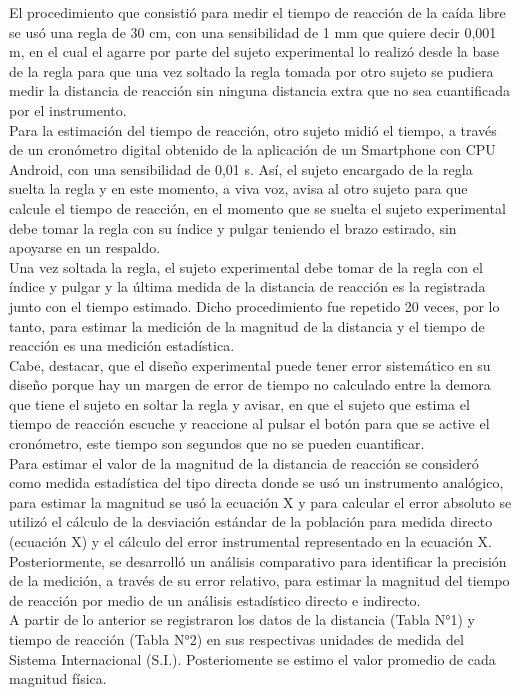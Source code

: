 \documentclass[runningheads]{llncs}
\begin{document}
    El procedimiento que consistió para medir el tiempo de reacción de la caída libre se usó una regla de 30 cm, con una sensibilidad de 1 mm que quiere decir 0,001 m, en el cual el agarre por parte del sujeto experimental lo realizó desde la base de la regla para que una vez soltado la regla tomada por otro sujeto se pudiera medir la distancia de reacción sin ninguna distancia extra que no sea cuantificada por el instrumento. \\
    \linebreak
    Para la estimación del tiempo de reacción, otro sujeto midió el tiempo, a través de un cronómetro digital obtenido de la aplicación de un Smartphone con CPU Android, con una sensibilidad de 0,01 s. Así, el sujeto encargado de la regla suelta la regla y en este momento, a viva voz, avisa al otro sujeto para que calcule el tiempo de reacción, en el momento que se suelta el sujeto experimental debe tomar la regla con su índice y pulgar teniendo el brazo estirado, sin apoyarse en un respaldo. \\
    \linebreak
    Una vez soltada la regla, el sujeto experimental debe tomar de la regla con el índice y pulgar y la última medida de la distancia de reacción es la registrada junto con el tiempo estimado. Dicho procedimiento fue repetido 20 veces, por lo tanto, para estimar la medición de la magnitud de la distancia y el tiempo de reacción es una medición estadística. \\
    \linebreak
    Cabe, destacar, que el diseño experimental puede tener error sistemático en su diseño porque hay un margen de error de tiempo no calculado entre la demora que tiene el sujeto en soltar la regla y avisar, en que el sujeto que estima el tiempo de reacción escuche y reaccione al pulsar el botón para que se active el cronómetro, este tiempo son segundos que no se pueden cuantificar. \\
    \linebreak
    Para estimar el valor de la magnitud de la distancia de reacción se consideró como medida estadística del tipo directa donde se usó un instrumento analógico, para estimar la magnitud se usó la ecuación X y para calcular el error absoluto se utilizó el cálculo de la desviación estándar de la población para medida directo (ecuación X) y el cálculo del error instrumental representado en la ecuación X. \\
    \linebreak
    Posteriormente, se desarrolló un análisis comparativo para identificar la precisión de la medición, a través de su error relativo, para estimar la magnitud del tiempo de reacción por medio de un análisis estadístico directo e indirecto. \\
    \linebreak
    A partir de lo anterior se registraron los datos de la distancia (Tabla N°1) y tiempo de reacción (Tabla N°2) en sus respectivas unidades de medida del Sistema Internacional (S.I.). Posteriomente se estimo el valor promedio de cada magnitud física. \\
\end{document}
